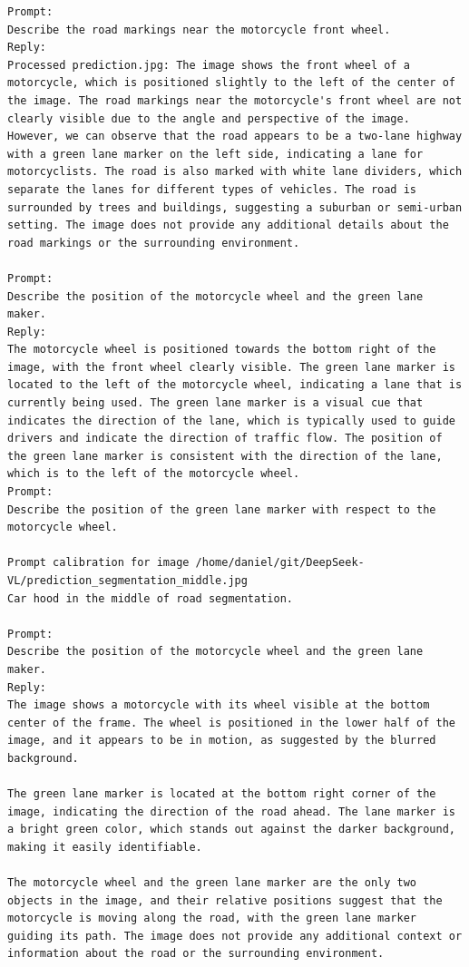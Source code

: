 \begin{verbatim}
Prompt:
Describe the road markings near the motorcycle front wheel.
Reply:
Processed prediction.jpg: The image shows the front wheel of a motorcycle, which is positioned slightly to the left of the center of the image. The road markings near the motorcycle's front wheel are not clearly visible due to the angle and perspective of the image. However, we can observe that the road appears to be a two-lane highway with a green lane marker on the left side, indicating a lane for motorcyclists. The road is also marked with white lane dividers, which separate the lanes for different types of vehicles. The road is surrounded by trees and buildings, suggesting a suburban or semi-urban setting. The image does not provide any additional details about the road markings or the surrounding environment.

Prompt:
Describe the position of the motorcycle wheel and the green lane maker.
Reply:
The motorcycle wheel is positioned towards the bottom right of the image, with the front wheel clearly visible. The green lane marker is located to the left of the motorcycle wheel, indicating a lane that is currently being used. The green lane marker is a visual cue that indicates the direction of the lane, which is typically used to guide drivers and indicate the direction of traffic flow. The position of the green lane marker is consistent with the direction of the lane, which is to the left of the motorcycle wheel.
Prompt:
Describe the position of the green lane marker with respect to the motorcycle wheel.

Prompt calibration for image /home/daniel/git/DeepSeek-VL/prediction_segmentation_middle.jpg
Car hood in the middle of road segmentation.

Prompt:
Describe the position of the motorcycle wheel and the green lane maker.
Reply:
The image shows a motorcycle with its wheel visible at the bottom center of the frame. The wheel is positioned in the lower half of the image, and it appears to be in motion, as suggested by the blurred background.

The green lane marker is located at the bottom right corner of the image, indicating the direction of the road ahead. The lane marker is a bright green color, which stands out against the darker background, making it easily identifiable.

The motorcycle wheel and the green lane marker are the only two objects in the image, and their relative positions suggest that the motorcycle is moving along the road, with the green lane marker guiding its path. The image does not provide any additional context or information about the road or the surrounding environment.


\end{verbatim}
